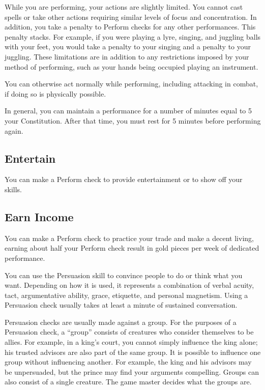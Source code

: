         While you are performing, your actions are slightly limited.
        You cannot cast spells or take other actions requiring similar levels of focus and concentration.
        In addition, you take a  penalty to Perform checks for any other performances.
        This penalty stacks.
        For example, if you were playing a lyre, singing, and juggling balls with your feet, you would take a  penalty to your singing and a  penalty to your juggling.
        These limitations are in addition to any restrictions imposed by your method of performing, such as your hands being occupied playing an instrument.

        You can otherwise act normally while performing, including attacking in combat, if doing so is physically possible.

        In general, you can maintain a performance for a number of minutes equal to 5 \add your Constitution.
        After that time, you must rest for 5 minutes before performing again.

    \subsection{Entertain}
        You can make a Perform check to provide entertainment or to show off your skills.

    \subsection{Earn Income}
        You can make a Perform check to practice your trade and make a decent living, earning about half your Perform check result in gold pieces per week of dedicated performance.

\newpage
{}
        You can use the Persuasion skill to convince people to do or think what you want. Depending on how it is used, it represents a combination of verbal acuity, tact, argumentative ability, grace, etiquette, and personal magnetism. Using a Persuasion check usually takes at least a minute of sustained conversation.

        Persuasion checks are usually made against a group. For the purposes of a Persuasion check, a ``group'' consists of creatures who consider themselves to be allies. For example, in a king's court, you cannot simply influence the king alone; his trusted advisors are also part of the same group. It is possible to influence one group without influencing another. For example, the king and his advisors may be unpersuaded, but the prince may find your arguments compelling. Groups can also consist of a single creature. The game master decides what the groups are.

